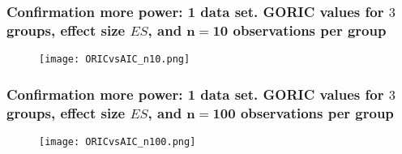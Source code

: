 \documentclass[10pt]{beamer}\usepackage[]{graphicx}\usepackage[]{xcolor}
\begin{document}
%
\begin{frame}
\frametitle{Confirmation more power: 1 data set. GORIC values for $3$ groups, effect size $ES$, and $\mathbf{n=10}$ observations per group}
%
%
\begin{figure}
    \centering
  \texttt{[image: ORICvsAIC\_n10.png]}\\
\end{figure}

\end{frame}
%
\begin{frame}
\frametitle{Confirmation more power: 1 data set. GORIC values for $3$ groups, effect size $ES$, and $\mathbf{n=100}$ observations per group}
\begin{figure}
    \centering
  \texttt{[image: ORICvsAIC\_n100.png]}\\
\end{figure}

\end{frame}
\end{document}
